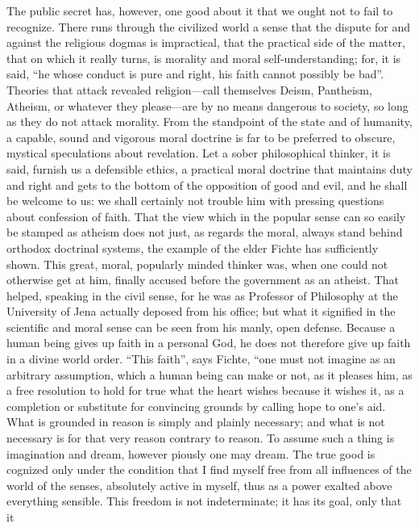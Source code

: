 \documentclass[12pt,a4paper,openany]{book}
\newcommand{\opage}[1]{\marginnote{\footnotesize\textit{[#1]}}}
\begin{document}
The public secret has, however, one good
about it that we ought not to fail to recognize. There runs through
the civilized world a sense that the dispute
for and against the religious dogmas is impractical, that
the practical side of the matter, that on which it really turns,
is morality and moral self-understanding; for,
it is said, ``he whose conduct is pure and right, his faith
cannot possibly be bad''. Theories that attack revealed
religion---call themselves Deism, Pantheism,
Atheism, or whatever they please---are by no means
dangerous to society, so long as they do not attack morality.
From the standpoint of the state and of humanity,
a capable, sound and vigorous moral doctrine is far to be preferred
to obscure, mystical speculations about revelation. Let a sober philosophical thinker, it is said,
furnish us a defensible
ethics, a practical moral doctrine that maintains duty and
right and gets to the bottom of the opposition of good and evil,
and he shall be welcome to us: we shall certainly not
trouble him with pressing questions about confession of faith.
That the view which in the popular sense can so
easily be stamped as atheism does not just, as regards the moral,
always stand behind orthodox doctrinal systems,
the example of the elder Fichte has
\setcounter{footnote}{0}%
\opage{526}sufficiently shown. This great, moral, popularly minded thinker
was, when one could not otherwise get
at him, finally accused before the government as an atheist.
That helped, speaking in the civil sense, for he was
as Professor of Philosophy at the University of Jena actually
deposed from his office; but what it signified in the scientific
and moral sense can be seen from his manly,
open defense. Because a human being gives up faith
in a personal God, he does not therefore give up faith
in a divine world order. ``This faith'', says
Fichte, ``one must not imagine as an arbitrary
assumption, which a human being can make or not, as
it pleases him, as a free resolution to hold for
true what the heart wishes because it wishes it, as
a completion or substitute for convincing
grounds by calling hope to one's aid. What is grounded
in reason is simply and plainly necessary; and what is not
necessary is for that very reason contrary to reason. To
assume such a thing is imagination and dream, however piously
one may dream. The true good is cognized only under
the condition that I find myself free from all influences
of the world of the senses, absolutely active in myself,
thus as a power exalted above everything sensible. This
freedom is not indeterminate; it has its goal, only that it
\end{document}
